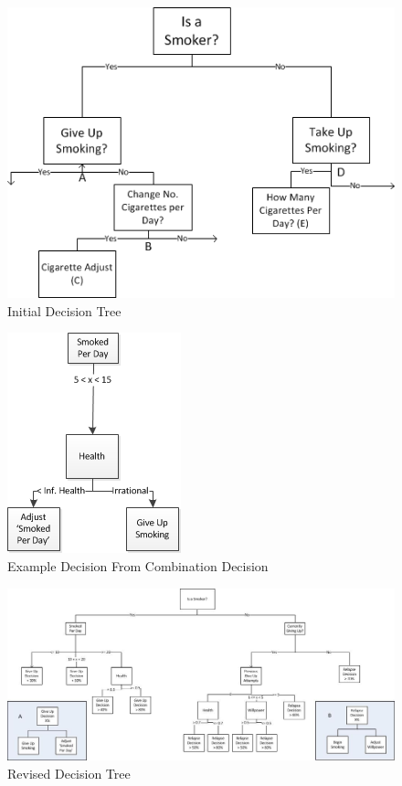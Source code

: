 \documentclass[]{report}
\begin{document}
\begin{figure}
\begin{center}
\includegraphics[scale=0.8]{DecTreeBasic2.png}
\end{center}
\caption{Initial Decision Tree}
\label{img:init-dectree}
\end{figure}

\begin{figure}
\begin{center}
\includegraphics[scale=1]{example-decision.png}
\end{center}
\caption{Example Decision From Combination Decision}
\label{img:example-decision}
\end{figure}

\begin{landscape}
\begin{figure}
\begin{center}
\includegraphics[width=\paperwidth,keepaspectratio]{DecTreev09.jpg}
\caption{Revised Decision Tree}
\label{img:09-dectree}
\end{center}
\end{figure}
\end{landscape}
\end{document}
